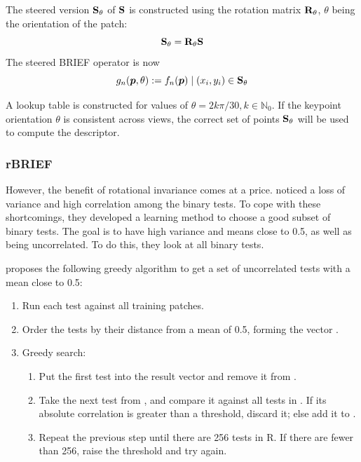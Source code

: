 The steered version $\mathbf{S}_\theta$ of $\mathbf{S}$ is constructed using the rotation matrix $\mathbf{R}_\theta$, $\theta$ being the orientation of the patch:
\begin{equation}
    \mathbf{S}_\theta = \mathbf{R}_\theta \mathbf{S}
\end{equation}
The steered BRIEF operator is now
\begin{equation}
    g_n(\boldsymbol{p},\theta):=f_n(\boldsymbol{p})\mid(x_i,y_i)\in \mathbf{S}_\theta
\end{equation}

A lookup table is constructed for values of $\theta = 2k\pi/30, k \in \mathbb{N}_0$. If the keypoint orientation $\theta$ is consistent across views, the correct set of points $\mathbf{S}_\theta$ will be used to compute the descriptor.

\subsubsection{rBRIEF}
However, the benefit of rotational invariance comes at a price. \cite{6126544} noticed a loss of variance and high correlation among the binary tests. To cope with these shortcomings, they developed a learning method to choose a good subset of binary tests. The goal is to have high variance and means close to 0.5, as well as being uncorrelated. To do this, they look at all binary tests.\bigskip

\cite{6126544} proposes the following greedy algorithm to get a set of uncorrelated tests with a mean close to 0.5:
\begin{enumerate}
    \item Run each test  against all training patches.\smallskip
    \item Order the tests by their distance from a mean of 0.5, forming the vector \vt.\smallskip
    \item Greedy search:\smallskip
    \begin{enumerate}
        \item Put the first test into the result vector \vr and remove it from \vt.\smallskip
        \item Take the next test from \vt, and compare it against all tests in \vr. If its absolute correlation is greater than a threshold, discard it; else add it to \vr.\smallskip
        \item Repeat the previous step until there are 256 tests in R. If there are fewer than 256, raise the threshold and try again.\smallskip
    \end{enumerate}
\end{enumerate}

